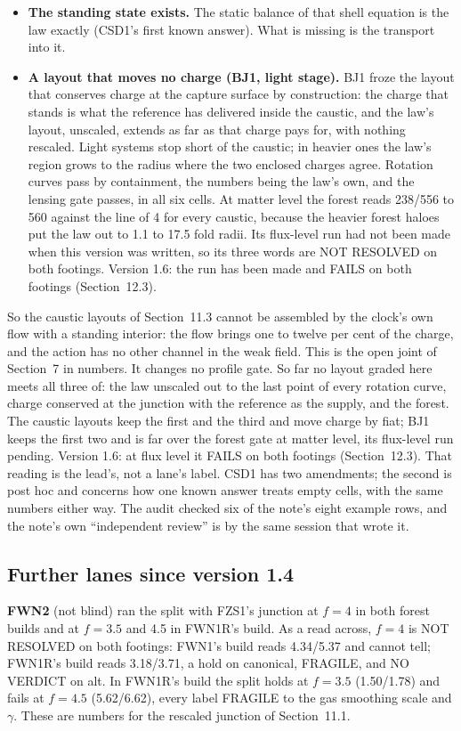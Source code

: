 \documentclass[10pt]{article}
\begin{document}
\begin{itemize}
\item \textbf{The standing state exists.} The static balance of that shell equation is the law exactly (CSD1's first known answer). What is missing is the transport into it.
\item \textbf{A layout that moves no charge (BJ1, light stage).} BJ1 froze the layout that conserves charge at the capture surface by construction: the charge that stands is what the reference has delivered inside the caustic, and the law's layout, unscaled, extends as far as that charge pays for, with nothing rescaled. Light systems stop short of the caustic; in heavier ones the law's region grows to the radius where the two enclosed charges agree. Rotation curves pass by containment, the numbers being the law's own, and the lensing gate passes, in all six cells. At matter level the forest reads 238/556 to 560 against the line of 4 for every caustic, because the heavier forest haloes put the law out to 1.1 to 17.5 fold radii. Its flux-level run had not been made when this version was written, so its three words are NOT RESOLVED on both footings. Version 1.6: the run has been made and FAILS on both footings (Section~12.3).
\end{itemize}
So the caustic layouts of Section~11.3 cannot be assembled by the clock's own flow with a standing interior: the flow brings one to twelve per cent of the charge, and the action has no other channel in the weak field. This is the open joint of Section~7 in numbers. It changes no profile gate. So far no layout graded here meets all three of: the law unscaled out to the last point of every rotation curve, charge conserved at the junction with the reference as the supply, and the forest. The caustic layouts keep the first and the third and move charge by fiat; BJ1 keeps the first two and is far over the forest gate at matter level, its flux-level run pending. Version 1.6: at flux level it FAILS on both footings (Section~12.3). That reading is the lead's, not a lane's label. CSD1 has two amendments; the second is post hoc and concerns how one known answer treats empty cells, with the same numbers either way. The audit checked six of the note's eight example rows, and the note's own ``independent review'' is by the same session that wrote it.

\subsection{Further lanes since version 1.4}
\textbf{FWN2} (not blind) ran the split with FZS1's junction at $f=4$ in both forest builds and at $f=3.5$ and 4.5 in FWN1R's build. As a read across, $f=4$ is NOT RESOLVED on both footings: FWN1's build reads 4.34/5.37 and cannot tell; FWN1R's build reads 3.18/3.71, a hold on canonical, FRAGILE, and NO VERDICT on alt. In FWN1R's build the split holds at $f=3.5$ (1.50/1.78) and fails at $f=4.5$ (5.62/6.62), every label FRAGILE to the gas smoothing scale and $\gamma$. These are numbers for the rescaled junction of Section~11.1.
\end{document}
